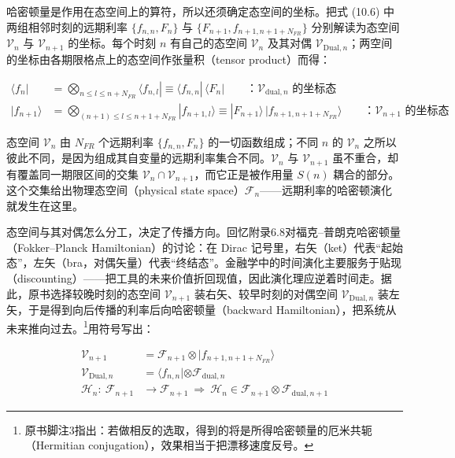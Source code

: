 哈密顿量是作用在态空间上的算符，所以还须确定态空间的坐标。把式 (10.6) 中两组相邻时刻的远期利率 $\{f_{n,n},F_n\}$ 与 $\{F_{n+1},f_{n+1,n+1+N_{FR}}\}$ 分别解读为态空间 $\mathcal{V}_n$ 与 $\mathcal{V}_{n+1}$ 的坐标。每个时刻 $n$ 有自己的态空间 $\mathcal{V}_n$ 及其对偶 $\mathcal{V}_{\text{Dual},n}$；两空间的坐标由各期限格点上的态空间作张量积（tensor product）而得：

\begin{equation*}
\begin{aligned}
\langle f_n|&=\bigotimes_{n\le l\le n+N_{FR}}\langle f_{n,l}|\equiv\langle f_{n,n}|\,\langle F_n|
\qquad\text{：}\mathcal{V}_{\text{dual},n}\text{ 的坐标态}\\[4pt]
|f_{n+1}\rangle&=\bigotimes_{(n+1)\le l\le n+1+N_{FR}}|f_{n+1,l}\rangle\equiv|F_{n+1}\rangle\,|f_{n+1,n+1+N_{FR}}\rangle
\qquad\text{：}\mathcal{V}_{n+1}\text{ 的坐标态}
\end{aligned}
\tag{10.9}
\end{equation*}

态空间 $\mathcal{V}_n$ 由 $N_{FR}$ 个远期利率 $\{f_{n,n},F_n\}$ 的一切函数组成；不同 $n$ 的 $\mathcal{V}_n$ 之所以彼此不同，是因为组成其自变量的远期利率集合不同。$\mathcal{V}_n$ 与 $\mathcal{V}_{n+1}$ 虽不重合，却有覆盖同一期限区间的交集 $\mathcal{V}_n\cap\mathcal{V}_{n+1}$，而它正是被作用量 $S(n)$ 耦合的部分。这个交集给出物理态空间（physical state space）$\mathcal{F}_n$——远期利率的哈密顿演化就发生在这里。

态空间与其对偶怎么分工，决定了传播方向。回忆附录6.8对福克–普朗克哈密顿量（Fokker–Planck Hamiltonian）的讨论：在 Dirac 记号里，右矢（ket）代表“起始态”，左矢（bra，对偶矢量）代表“终结态”。金融学中的时间演化主要服务于贴现（discounting）——把工具的未来价值折回现值，因此演化理应逆着时间走。据此，原书选择较晚时刻的态空间 $\mathcal{V}_{n+1}$ 装右矢、较早时刻的对偶空间 $\mathcal{V}_{\text{Dual},n}$ 装左矢，于是得到向后传播的利率后向哈密顿量（backward Hamiltonian），把系统从未来推向过去。\footnote{原书脚注3指出：若做相反的选取，得到的将是所得哈密顿量的厄米共轭（Hermitian conjugation），效果相当于把漂移速度反号。}用符号写出：

\begin{equation*}
\begin{aligned}
\mathcal{V}_{n+1}&=\mathcal{F}_{n+1}\otimes|f_{n+1,n+1+N_{FR}}\rangle\\
\mathcal{V}_{\text{Dual},n}&=\langle f_{n,n}|\otimes\mathcal{F}_{\text{dual},n}\\
\mathcal{H}_n:\ \mathcal{F}_{n+1}&\to\mathcal{F}_{n+1}
\ \Rightarrow\ \mathcal{H}_n\in\mathcal{F}_{n+1}\otimes\mathcal{F}_{\text{dual},n+1}
\end{aligned}
\end{equation*}


